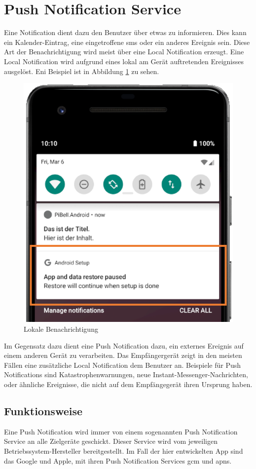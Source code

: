 \section{Push Notification Service}
Eine Notification dient dazu den Benutzer über etwas zu informieren. Dies kann ein Kalender-Eintrag, eine eingetroffene \ac{sms} oder ein anderes Ereignis sein. Diese Art der Benachrichtigung wird meist über eine Local Notification erzeugt. Eine Local Notification wird aufgrund eines lokal am Gerät auftretenden Ereignisses ausgelöst. Eni Beispiel ist in Abbildung \ref{fig:local-notification} zu sehen.
\begin{figure}
    \centering\includegraphics[width=.5\linewidth]{images/xamarin/LocalNotification.png}
    \caption{Lokale Benachrichtigung}
    \label{fig:local-notification}
\end{figure}

Im Gegensatz dazu dient eine Push Notification dazu, ein externes Ereignis auf einem anderen Gerät zu verarbeiten.
Das Empfängergerät zeigt in den meisten Fällen eine zusätzliche Local Notification dem Benutzer an.
Beispiele für Push Notifications sind Katastrophenwarnungen, neue Instant-Messenger-Nachrichten, oder ähnliche Ereignisse, die nicht auf dem Empfängegerät ihren Ursprung haben.

\subsection{Funktionsweise}
Eine Push Notification wird immer von einem sogenannten Push Notification Service an alle Zielgeräte geschickt.
Dieser Service wird vom jeweiligen Betriebssystem-Hersteller bereitgestellt.
Im Fall der hier entwickelten App sind das Google und Apple, mit ihren Push Notification Services \ac{gcm} und \ac{apns}.\par


